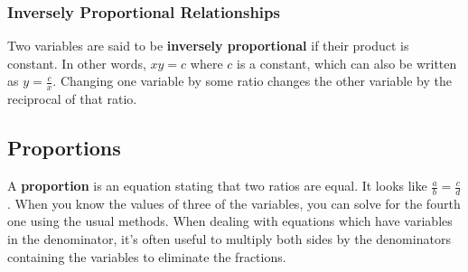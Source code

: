\documentclass{article}
\begin{document}
\subsubsection*{Inversely Proportional Relationships}
Two variables are said to be \textbf{inversely proportional} if their product is constant.
In other words, $xy = c$ where $c$ is a constant, which can also be written as $y = \frac{c}{x}$.
Changing one variable by some ratio changes the other variable by the reciprocal of that ratio.

\subsection*{Proportions}
A \textbf{proportion} is an equation stating that two ratios are equal.
It looks like $\frac{a}{b} = \frac{c}{d}$.
When you know the values of three of the variables, you can solve for the fourth one using the usual methods.
When dealing with equations which have variables in the denominator, it's often useful to multiply both sides by the denominators containing the variables to eliminate the fractions.
\end{document}

